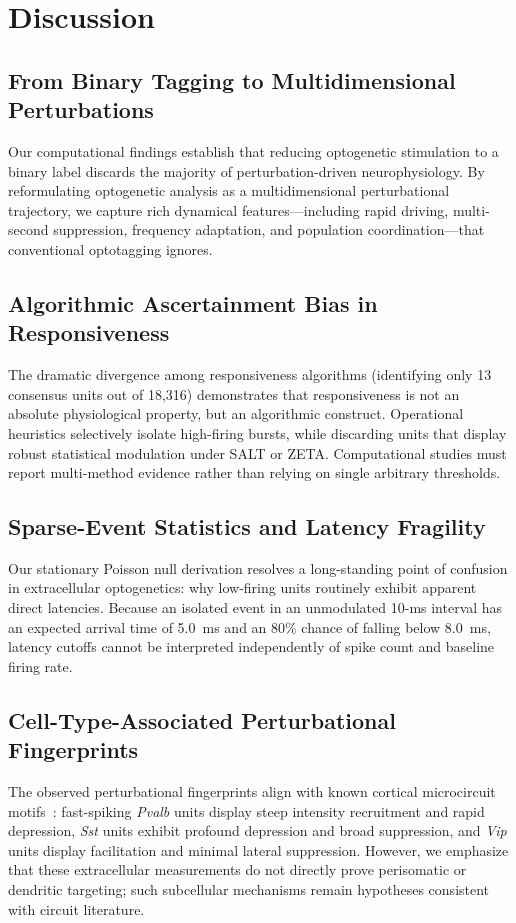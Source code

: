 \documentclass[10pt,journal,compsoc]{IEEEtran}
\begin{document}
\section{Discussion}

\subsection{From Binary Tagging to Multidimensional Perturbations}
Our computational findings establish that reducing optogenetic stimulation to a binary label discards the majority of perturbation-driven neurophysiology. By reformulating optogenetic analysis as a multidimensional perturbational trajectory, we capture rich dynamical features—including rapid driving, multi-second suppression, frequency adaptation, and population coordination—that conventional optotagging ignores.

\subsection{Algorithmic Ascertainment Bias in Responsiveness}
The dramatic divergence among responsiveness algorithms (identifying only 13 consensus units out of 18,316) demonstrates that responsiveness is not an absolute physiological property, but an algorithmic construct. Operational heuristics selectively isolate high-firing bursts, while discarding units that display robust statistical modulation under SALT or ZETA. Computational studies must report multi-method evidence rather than relying on single arbitrary thresholds.

\subsection{Sparse-Event Statistics and Latency Fragility}
Our stationary Poisson null derivation resolves a long-standing point of confusion in extracellular optogenetics: why low-firing units routinely exhibit apparent direct latencies. Because an isolated event in an unmodulated 10-ms interval has an expected arrival time of 5.0~ms and an 80\% chance of falling below 8.0~ms, latency cutoffs cannot be interpreted independently of spike count and baseline firing rate.

\subsection{Cell-Type-Associated Perturbational Fingerprints}
The observed perturbational fingerprints align with known cortical microcircuit motifs~\cite{cardin2009driving,sohal2009parvalbumin,atallah2012parvalbumin,lee2012activation,wilson2012division}: fast-spiking \textit{Pvalb} units display steep intensity recruitment and rapid depression, \textit{Sst} units exhibit profound depression and broad suppression, and \textit{Vip} units display facilitation and minimal lateral suppression. However, we emphasize that these extracellular measurements do not directly prove perisomatic or dendritic targeting; such subcellular mechanisms remain hypotheses consistent with circuit literature.
\end{document}
